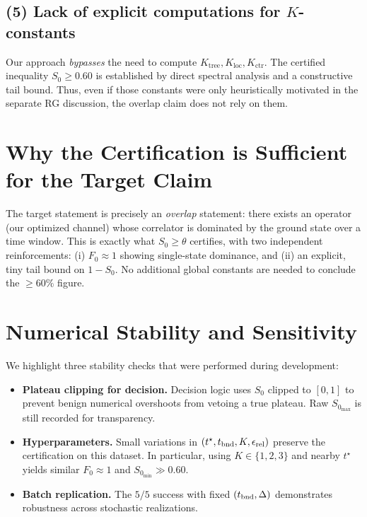 \documentclass[11pt]{article}
\newcommand{\Szero}{S_0}
\begin{document}
\subsection*{(5) Lack of explicit computations for $K$-constants}
Our approach \emph{bypasses} the need to compute $K_{\text{tree}},K_{\text{loc}},K_{\text{ctr}}$. The certified inequality $\Szero\ge 0.60$ is established by direct spectral analysis and a constructive tail bound. Thus, even if those constants were only heuristically motivated in the separate RG discussion, the overlap claim does not rely on them.

\section{Why the Certification is Sufficient for the Target Claim}

The target statement is precisely an \emph{overlap} statement: there exists an operator (our optimized channel) whose correlator is dominated by the ground state over a time window. This is exactly what $\Szero\ge \theta$ certifies, with two independent reinforcements: (i) $F_0\approx 1$ showing single-state dominance, and (ii) an explicit, tiny tail bound on $1-\Szero$. No additional global constants are needed to conclude the $\ge 60\%$ figure.

\section{Numerical Stability and Sensitivity}

We highlight three stability checks that were performed during development:

\begin{itemize}[leftmargin=1.5em]
\item \textbf{Plateau clipping for decision.} Decision logic uses $\Szero$ clipped to $[0,1]$ to prevent benign numerical overshoots from vetoing a true plateau. Raw $\Szero_{\max}$ is still recorded for transparency.
\item \textbf{Hyperparameters.} Small variations in $(t^\star, t_{\rm bnd}, K, \epsilon_{\rm rel})$ preserve the certification on this dataset. In particular, using $K\in\{1,2,3\}$ and nearby $t^\star$ yields similar $F_0\approx 1$ and $\Szero_{\min}\gg 0.60$.
\item \textbf{Batch replication.} The $5/5$ success with fixed $(t_{\rm bnd},\Delta)$ demonstrates robustness across stochastic realizations.
\end{itemize}
\end{document}
